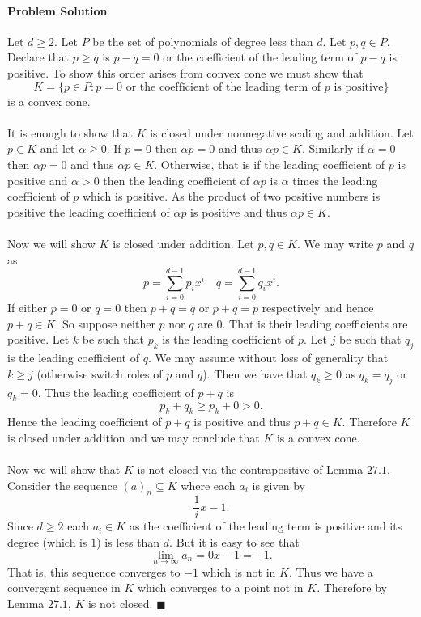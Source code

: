 \documentclass[letterpaper,12pt,oneside,onecolumn]{article}
\begin{document}
\paragraph{Problem Solution}
Let $d \geq 2$. Let $P$ be the set of polynomials of degree less than $d$. Let $p,q \in P$. Declare that $p \geq q$ is $p-q = 0$ or the coefficient of the leading term of $p-q$ is positive. To show this order arises from convex cone we must show that $$K = \{p \in P : p=0 \text{ or the coefficient of the leading term of $p$ is positive}\}$$
is a convex cone.
\paragraph{}
It is enough to show that $K$ is closed under nonnegative scaling and addition. Let $p \in K$ and let $\alpha \geq 0$. If $p = 0$ then $\alpha p = 0$ and thus $\alpha p \in K$. Similarly if $\alpha = 0$ then $\alpha p = 0$ and thus $\alpha p \in K$. Otherwise, that is if the leading coefficient of $p$ is positive and $\alpha > 0$ then the leading coefficient of $\alpha p$ is $\alpha$ times the leading coefficient of $p$ which is positive. As the product of two positive numbers is positive the leading coefficient of $\alpha p$ is positive and thus $\alpha p \in K$.
\paragraph{}
Now we will show $K$ is closed under addition. Let $p, q \in K$. We may write $p$ and $q$ as
$$p = \sum_{i=0}^{d-1}p_i x^i \quad q = \sum_{i=0}^{d-1} q_i x^i.$$
If either $p=0$ or $q=0$ then $p+q=q$ or $p+q = p$ respectively and hence $p+q \in K$. So suppose neither $p$ nor $q$ are $0$. That is their leading coefficients are positive. Let $k$ be such that $p_k$ is the leading coefficient of $p$. Let $j$ be such that $q_j$ is the leading coefficient of $q$. We may assume without loss of generality that $k \geq j$ (otherwise switch roles of $p$ and $q$). Then we have that $q_k \geq 0$ as $q_k=q_j$ or $q_k = 0$. Thus the leading coefficient of $p+q$ is $$p_k + q_k \geq p_k + 0 > 0.$$
Hence the leading coefficient of $p+q$ is positive and thus $p+q \in K$. Therefore $K$ is closed under addition and we may conclude that $K$ is a convex cone.
\paragraph{}
Now we will show that $K$ is not closed via the contrapositive of Lemma $27.1$. Consider the sequence $(a)_n \subseteq K$ where each $a_i$ is given by
$$\frac{1}{i}x - 1.$$
Since $d \geq 2$ each $a_i \in K$ as the coefficient of the leading term is positive and its degree (which is $1$) is less than $d$. But it is easy to see that
$$ \lim_{n \rightarrow \infty} a_n = 0x -1 = -1.$$
That is, this sequence converges to $-1$ which is not in $K$. Thus we have a convergent sequence in $K$ which converges to a point not in $K$. Therefore by Lemma $27.1$, $K$ is not closed. $\blacksquare$
\end{document}
